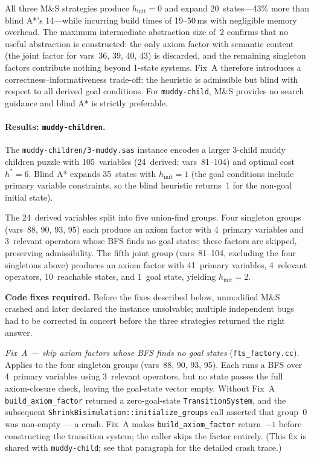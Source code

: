 \documentclass[11pt,a4paper]{article}
\begin{document}
    All three M\&S strategies produce $h_{\mathrm{init}} = 0$ and expand
    20~states---43\% more than blind A*'s 14---while incurring build times
    of 19--50\,ms with negligible memory overhead.
    The maximum intermediate abstraction size of~2 confirms that no useful
    abstraction is constructed: the only axiom factor with semantic content
    (the joint factor for vars~36, 39, 40, 43) is discarded, and the
    remaining singleton factors contribute nothing beyond 1-state systems.
    Fix~A therefore introduces a correctness--informativeness trade-off:
    the heuristic is admissible but blind with respect to all derived goal
    conditions.
    For \texttt{muddy-child}, M\&S provides no search guidance and blind A*
    is strictly preferable.

    \paragraph{Results: \texttt{muddy-children}.}

    The \texttt{muddy-children/3-muddy.sas} instance encodes a larger 3-child
    muddy children puzzle with 105~variables (24~derived: vars~81--104) and
    optimal cost $h^* = 6$.
    Blind A* expands 35~states with $h_{\mathrm{init}} = 1$ (the goal
    conditions include primary variable constraints, so the blind heuristic
    returns~1 for the non-goal initial state).

    The 24~derived variables split into five union-find groups.
    Four singleton groups (vars~88, 90, 93, 95) each produce an axiom factor
    with 4~primary variables and 3~relevant operators whose BFS finds no goal
    states; these factors are skipped, preserving admissibility.
    The fifth joint group (vars~81--104, excluding the four singletons above)
    produces an axiom factor with 41~primary variables, 4~relevant operators,
    10~reachable states, and 1~goal state, yielding $h_{\mathrm{init}} = 2$.

    \textbf{Code fixes required.}
    Before the fixes described below, unmodified M\&S crashed and later
    declared the instance unsolvable; multiple independent bugs had to be
    corrected in concert before the three strategies returned the right answer.

    \emph{Fix~A — skip axiom factors whose BFS finds no goal states}
    (\texttt{fts\_factory.cc}).
    Applies to the four singleton groups (vars~88, 90, 93, 95).
    Each runs a BFS over 4~primary variables using 3~relevant operators, but
    no state passes the full axiom-closure check, leaving the goal-state vector
    empty.
    Without Fix~A \texttt{build\_axiom\_factor} returned a zero-goal-state
    \texttt{TransitionSystem}, and the subsequent
    \texttt{ShrinkBisimulation::initialize\_groups} call asserted that
    group~0 was non-empty — a crash.
    Fix~A makes \texttt{build\_axiom\_factor} return~$-1$ before constructing
    the transition system; the caller skips the factor entirely.
    (This fix is shared with \texttt{muddy-child}; see that paragraph for
    the detailed crash trace.)
\end{document}
